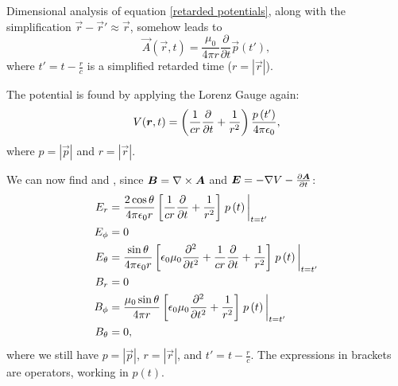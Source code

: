     Dimensional analysis of equation \ref{retarded potentials}, along with the simplification $\vec{r} - \vec{r}' \approx \vec{r}$, 
    somehow leads to 
    \begin{equation}
        \vec{A}\left(\vec{r}, t\right) = \frac{\mu_0}{4\pi r} \frac{\partial }{\partial t}\vec{p}\left(t'\right),
    \end{equation} 
    where $t' = t - \frac{{r}}{c}$ is a simplified retarded time ($r = |\vec{r}|$).

    The potential is found by applying the Lorenz Gauge again:
    \begin{equation}
        V(\bm{r}, t) =
        \left(\frac{1}{cr}\frac{\partial}{\partial t} + \frac{1}{r^2} \right)
        \frac{p\left(t'\right)}{4\pi\epsilon_0},
    \end{equation}
    where $p = |\vec{p}|$ and $r = |\vec{r}|$.

    We can now find \B{} and \E, since $\bm{B} = \nabla\times\bm{A}$ and $\bm{E} = -\nabla V - \frac{\partial\bm{A}}{\partial t}$:
    \begin{align}
        E_r &= \frac{2\cos\theta}{4\pi\e r}\left[\frac{1}{cr}\frac{\partial}{\partial t} + \frac{1}{r^2}\right]
                \eval{p\left(t\right)}_{t=t'}\\
        E_\phi &= 0 \\
        E_\theta &= \frac{\sin\theta}{4\pi\e r}\left[\e\mu_0\frac{\partial^2}{\partial t^2} 
                + \frac{1}{cr}\frac{\partial}{\partial t} + \frac{1}{r^2}\right]
                \eval{p\left(t\right)}_{t=t'}\\
        B_r &= 0 \\
        B_\phi &= \frac{\mu_0 \sin\theta}{4\pi r}\left[\e\mu_0\frac{\partial^2}{\partial t^2} + \frac{1}{r^2}\right]
            \eval{p\left(t\right)}_{t=t'}\\
        B_\theta &= 0,
    \end{align}
    where we still have $p = |\vec{p}|$, $r = |\vec{r}|$, and $t' = t - \frac{{r}}{c}$. The expressions in brackets are operators, working in $p(t)$.

